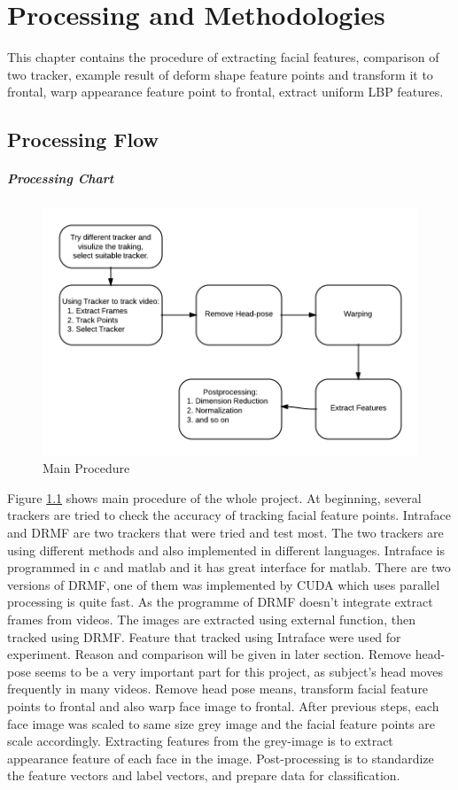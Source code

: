 \chapter{Processing and Methodologies}
This chapter contains the procedure of extracting facial features, comparison of two tracker, example result of deform shape feature points and transform it to frontal, warp appearance feature point to frontal, extract uniform LBP features. 
\section{Processing Flow}
\paragraph{Processing Chart}
\begin{figure}[ht]
\centering
\includegraphics[width=\textwidth]{imgs/ProcedureChart.png}
\caption{Main Procedure}
\label{fig:proc}
\end{figure}
Figure \ref{fig:proc} shows main procedure of the whole project. At beginning, several trackers are tried to check the accuracy of tracking facial feature points. Intraface and DRMF are two trackers that were tried and test most. The two trackers are using different methods and also implemented in different languages. Intraface is programmed in c and matlab and it has great interface for matlab. There are two versions of DRMF, one of them was implemented by CUDA which uses parallel processing is quite fast. As the programme of DRMF doesn't integrate extract frames from videos. The images are extracted using external function, then tracked using DRMF. Feature that tracked using Intraface were used for experiment. Reason and comparison will be given in later section. Remove head-pose seems to be a very important part for this project, as subject's head moves frequently in many videos. Remove head pose means, transform facial feature points to frontal and also warp face image to frontal. After previous steps, each face image was scaled to same size grey image and the facial feature points are scale accordingly. Extracting features from the grey-image is to extract appearance feature of each face in the image. Post-processing is to standardize the feature vectors and label vectors, and prepare data for classification.
